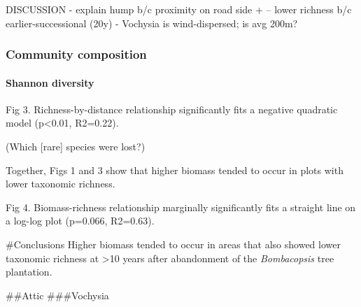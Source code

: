 \documentclass[]{article}
\let\oldparagraph\paragraph
\renewcommand{\paragraph}[1]{\oldparagraph{#1}\mbox{}}
\begin{document}
DISCUSSION - explain hump b/c proximity on road side + -- lower richness
b/c earlier-successional (20y) - Vochysia is wind-dispersed; is avg
200m?

\hypertarget{community-composition-1}{%
\subsubsection{Community composition}\label{community-composition-1}}

\hypertarget{shannon-diversity}{%
\paragraph{Shannon diversity}\label{shannon-diversity}}

Fig 3. Richness-by-distance relationship significantly fits a negative
quadratic model (p\textless{}0.01, R2=0.22).

(Which {[}rare{]} species were lost?)

Together, Figs 1 and 3 show that higher biomass tended to occur in plots
with lower taxonomic richness.

Fig 4. Biomass-richness relationship marginally significantly fits a
straight line on a log-log plot (p=0.066, R2=0.63).

\#Conclusions Higher biomass tended to occur in areas that also showed
lower taxonomic richness at \textgreater{}10 years after abandonment of
the \emph{Bombacopsis} tree plantation.

\#\#Attic \#\#\#Vochysia
\end{document}

